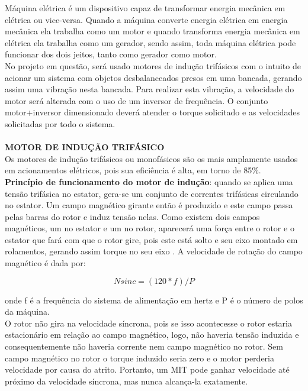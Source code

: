  \label{desenvolvimento_eletromecanica}

Máquina elétrica é um dispositivo capaz de transformar energia mecânica em elétrica ou vice-versa. Quando a máquina converte energia elétrica em energia mecânica ela trabalha como um motor e quando transforma energia mecânica em elétrica ela trabalha como um gerador, sendo assim, toda máquina elétrica pode funcionar dos dois jeitos, tanto como gerador como motor. \cite{chapman}  \\

No projeto em questão, será usado motores de indução trifásicos com o intuito de acionar um sistema com objetos desbalanceados presos em uma bancada, gerando assim uma vibração nesta bancada. Para realizar esta vibração, a velocidade do motor será alterada com o uso de um inversor de frequência. O conjunto motor+inversor dimensionado deverá atender o torque solicitado e as velocidades solicitadas por todo o sistema.\\
\\
\textbf{MOTOR DE INDUÇÃO TRIFÁSICO}\\

Os motores de indução trifásicos ou monofásicos são os mais amplamente usados em acionamentos elétricos, pois sua eficiência é alta, em torno de 85\%.\cite{WEG}
\\

\textbf{Princípio de funcionamento do motor de indução}: quando se aplica uma tensão trifásica no estator, gera-se um conjunto de correntes trifásicas circulando no estator. Um campo magnético girante então é produzido e este campo passa pelas barras do rotor e induz tensão nelas. Como existem dois campos magnéticos, um no estator e um no rotor, aparecerá uma força entre o rotor e o estator que fará com que o rotor gire, pois este está solto e seu eixo montado em rolamentos, gerando assim torque no seu eixo \cite{chapman}. A velocidade de rotação do campo magnético é dada por:


    \begin{equation}\label{Rotação de Campo Mag.}
            Nsinc=(120*f)/P
    \end{equation}

onde f é a frequência do sistema de alimentação em hertz e P é o número de polos da máquina. \cite{chapman}
\\

O rotor não gira na velocidade síncrona, pois se isso acontecesse o rotor estaria estacionário em relação ao campo magnético, logo, não haveria tensão induzida e consequentemente não haveria corrente nem campo magnético no rotor. Sem campo magnético no rotor o torque induzido seria zero e o motor perderia velocidade por causa do atrito. Portanto, um MIT pode ganhar velocidade até próximo da velocidade síncrona, mas nunca alcança-la exatamente.\cite{chapman}
\\

